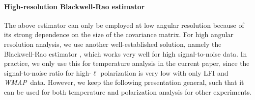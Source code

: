 \documentclass[twocolumn]{aa}
\def\WMAP{\emph{WMAP}}
\begin{document}
\paragraph{High-resolution Blackwell-Rao estimator}

The above estimator can only be employed at low angular resolution
because of its strong dependence on the size of the covariance
matrix. For high angular resolution analysis, we use another
well-established solution, namely the Blackwell-Rao estimator
\citep{chu2005}, which works very well for high signal-to-noise
data. In practice, we only use this for temperature analysis in the
current paper, since the signal-to-noise ratio for high-$\ell$
polarization is very low with only LFI and \WMAP\ data. However, we
keep the following presentation general, such that it can be used for
both temperature and polarization analysis for other experiments.
\end{document}
